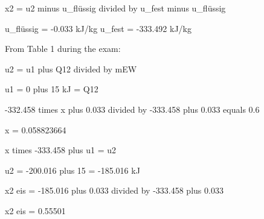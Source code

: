 x2 = u2 minus u_flüssig divided by u_fest minus u_flüssig  

u_flüssig = -0.033 kJ/kg  
u_fest = -333.492 kJ/kg  

From Table 1 during the exam:  

u2 = u1 plus Q12 divided by mEW  

u1 = 0 plus 15 kJ = Q12  

-332.458 times x plus 0.033 divided by -333.458 plus 0.033 equals 0.6  

x = 0.058823664  

x times -333.458 plus u1 = u2  

u2 = -200.016 plus 15 = -185.016 kJ  

x2 eis = -185.016 plus 0.033 divided by -333.458 plus 0.033  

x2 eis = 0.55501